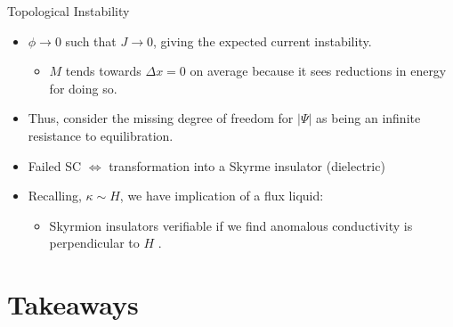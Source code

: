 \documentclass{beamer}
\begin{document}


\begin{frame}{Topological Instability}
    
    \begin{itemize}
        \item $\phi \to 0$ such that $J\to 0$, giving the expected current instability.
        \begin{itemize}
            \item $M$ tends towards $\Delta x = 0$ on average because it sees reductions in energy for doing so.
        \end{itemize}
        
        \item Thus, consider the missing degree of freedom for $|\Psi|$ as being an infinite resistance to equilibration.
        
        \item Failed SC $\Leftrightarrow$ transformation into a Skyrme insulator (dielectric)
        
        \item Recalling, $\kappa \sim H$, we have implication of a flux liquid:
        \begin{itemize}
            \item Skyrmion insulators verifiable if we find anomalous conductivity is perpendicular to $H$ \cite{coleman2017}.
        \end{itemize}
    \end{itemize}

\end{frame}


\section{Takeaways}
\end{document}
